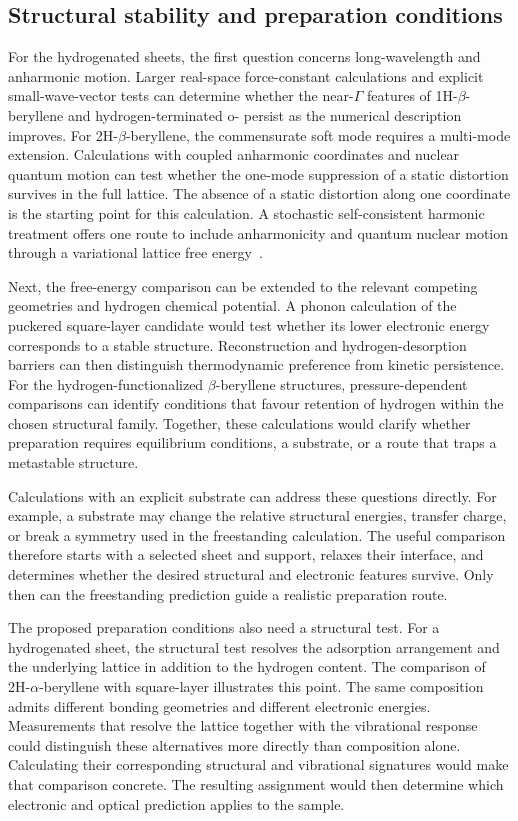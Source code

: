 \subsection{Structural stability and preparation conditions}

For the hydrogenated sheets, the first question concerns long-wavelength and anharmonic motion.
Larger real-space force-constant calculations and explicit small-wave-vector tests can determine whether the near-$\Gamma$ features of 1H-$\beta$-beryllene and hydrogen-terminated o- persist as the numerical description improves.
For 2H-$\beta$-beryllene, the commensurate soft mode requires a multi-mode extension.
Calculations with coupled anharmonic coordinates and nuclear quantum motion can test whether the one-mode suppression of a static distortion survives in the full lattice.
The absence of a static distortion along one coordinate is the starting point for this calculation.
A stochastic self-consistent harmonic treatment offers one route to include anharmonicity and quantum nuclear motion through a variational lattice free energy~\cite{errea2014anharmonic}.

Next, the free-energy comparison can be extended to the relevant competing geometries and hydrogen chemical potential.
A phonon calculation of the puckered square-layer  candidate would test whether its lower electronic energy corresponds to a stable structure.
Reconstruction and hydrogen-desorption barriers can then distinguish thermodynamic preference from kinetic persistence.
For the hydrogen-functionalized $\beta$-beryllene structures, pressure-dependent comparisons can identify conditions that favour retention of hydrogen within the chosen structural family.
Together, these calculations would clarify whether preparation requires equilibrium conditions, a substrate, or a route that traps a metastable structure.

Calculations with an explicit substrate can address these questions directly.
For example, a substrate may change the relative structural energies, transfer charge, or break a symmetry used in the freestanding calculation.
The useful comparison therefore starts with a selected sheet and support, relaxes their interface, and determines whether the desired structural and electronic features survive.
Only then can the freestanding prediction guide a realistic preparation route.

The proposed preparation conditions also need a structural test.
For a hydrogenated sheet, the structural test resolves the adsorption arrangement and the underlying lattice in addition to the hydrogen content.
The comparison of 2H-$\alpha$-beryllene with square-layer  illustrates this point.
The same composition admits different bonding geometries and different electronic energies.
Measurements that resolve the lattice together with the vibrational response could distinguish these alternatives more directly than composition alone.
Calculating their corresponding structural and vibrational signatures would make that comparison concrete.
The resulting assignment would then determine which electronic and optical prediction applies to the sample.

